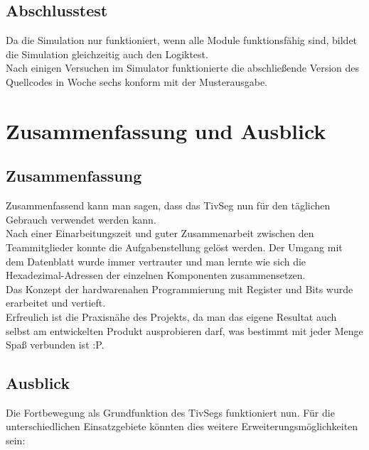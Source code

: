 \documentclass[a4paper,10pt,twoside]{report}
\newcounter{ausgabe}[chapter]
\begin{document}
\section{Abschlusstest}
Da die Simulation nur funktioniert, wenn alle Module funktionsfähig sind, bildet die Simulation gleichzeitig auch den Logiktest.\\
Nach einigen Versuchen im Simulator funktionierte die abschließende Version des Quellcodes in Woche sechs konform mit der Musterausgabe.

\chapter{Zusammenfassung und Ausblick}
\section{Zusammenfassung}
Zusammenfassend kann man sagen, dass das TivSeg nun für den täglichen Gebrauch verwendet werden kann.\\ Nach einer Einarbeitungszeit und guter Zusammenarbeit zwischen den Teammitglieder konnte die Aufgabenstellung gelöst werden. Der Umgang mit dem Datenblatt wurde immer vertrauter und man lernte wie sich die Hexadezimal-Adressen der einzelnen Komponenten zusammensetzen.\\
Das Konzept der hardwarenahen Programmierung mit Register und Bits wurde erarbeitet und vertieft.\\
Erfreulich ist die Praxisnähe des Projekts, da man das eigene Resultat auch selbst am entwickelten Produkt ausprobieren darf, was bestimmt mit jeder Menge Spaß verbunden ist :P.    

\section{Ausblick}
Die Fortbewegung als Grundfunktion des TivSegs funktioniert nun. Für die unterschiedlichen Einsatzgebiete könnten dies weitere Erweiterungsmöglichkeiten sein:
\end{document}
